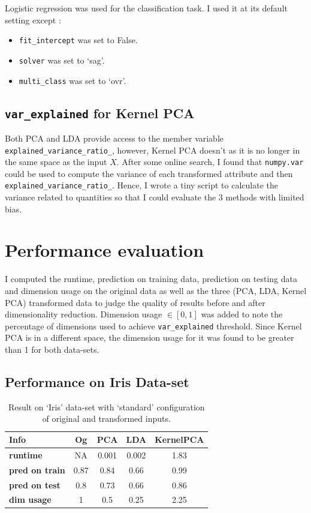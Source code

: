 \documentclass[12pt]{article}
\begin{document}
Logistic regression was used for the classification task. I used it at its default setting except :

\begin{itemize}
\item \texttt{fit\_intercept} was set to False.
\item \texttt{solver} was set to `sag'.
\item \texttt{multi\_class} was set to `ovr'.
\end{itemize}

\subsection*{\texttt{var\_explained} for Kernel PCA}

Both PCA and LDA provide access to the member variable \texttt{explained\_variance\_ratio\_}, however, Kernel PCA doesn't as it is no longer in the same space as the input $X$. After some online search, I found that \texttt{numpy.var} could be used to compute the variance of each transformed attribute and then \texttt{explained\_variance\_ratio\_}. Hence, I wrote a tiny script to calculate the variance related to quantities so that I could evaluate the 3 methods with limited bias.

\section*{Performance evaluation}

I computed the runtime, prediction on training data, prediction on testing data and dimension usage on the original data as well as the three (PCA, LDA, Kernel PCA) transformed data to judge the quality of results before and after dimensionality reduction. Dimension usage $\in [0, 1]$ was added to note the percentage of dimensions used to achieve \texttt{var\_explained} threshold. Since Kernel PCA is in a different space, the dimension usage for it was found to be greater than 1 for both data-sets.

\subsection*{Performance on Iris Data-set}

\begin{table}[!hptb]
\centering
\begin{tabular}{|l|c|c|c|c|}
\hline
\textbf{Info} & \textbf{Og} & \textbf{PCA} & \textbf{LDA} & \textbf{KernelPCA} \\\hline
\textbf{runtime} & NA &	 0.001 & 0.002 & 1.83 \\
\textbf{pred on train} & 0.87 & 0.84 & 0.66 & 0.99 \\
\textbf{pred on test} & 0.8 & 0.73 & 0.66 & 0.86 \\
\textbf{dim usage} & 1 & 0.5 & 0.25 & 2.25 \\\hline
\end{tabular}
\caption{Result on `Iris' data-set with `standard' configuration of original and transformed inputs.}
\end{table}
\end{document}
